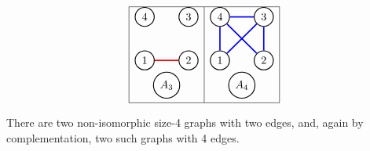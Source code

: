 \[
    \begin{array}{|l|l|}
        \hline
        \begin{tikzpicture}
        [scale=.2]
        \begin{scope}[every node/.style={circle,thick,draw}]
            \node (1) at (0,4) {1};
            \node (2) at (7,4) {2};
            \node (3) at (7,11) {3};
            \node (4) at (0,11) {4};
           \node(A) at (3.5,0) {$A_3$};
        \end{scope}

        \begin{scope}[%
                      every node/.style={fill=white,circle},
                      every edge/.style={draw=red,very thick}]
              \draw (1) edge  (2);
        \end{scope}
        \end{tikzpicture}
        &
        \begin{tikzpicture}
        [scale=.2]
        \begin{scope}[every node/.style={circle,thick,draw}]
            \node (1) at (0,4) {1};
            \node (2) at (7,4) {2};
            \node (3) at (7,11) {3};
            \node (4) at (0,11) {4};
           \node(A) at (3.5,0) {$A_4$};
        \end{scope}

        \begin{scope}[%
                      every node/.style={fill=white,circle},
                      every edge/.style={draw=blue,very thick}]
             \draw (2) edge  (3);
             \draw (3) edge  (4);
             \draw (4) edge  (1);
             \draw (4) edge  (2);
             \draw (3) edge  (1);
                     
        \end{scope}
        \end{tikzpicture}\\
        \hline
    \end{array}
\]

There are two non-isomorphic size-4 graphs with two edges, and, again by complementation, two such graphs with 4 edges. 

